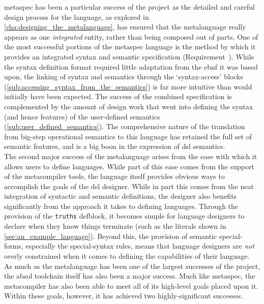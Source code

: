 \gls{metaspec} has been a particular success of the project as the detailed and careful design process for the language, as explored in \autoref{cha:designing_the_metalanguage}, has ensured that the metalanguage really appears as one \textit{integrated} entity, rather than being composed out of parts.
One of the most successful portions of the metaspec language is the method by which it provides an integrated syntax and semantic specification (Requirement~).
While the syntax definition format required little adaptation from the \gls{ebnf} it was based upon, the linking of syntax and semantics through the `syntax-access' blocks (\autoref{sub:accessing_syntax_from_the_semantics}) is far more intuitive than would initially have been expected. 
The success of the combined specification is complemented by the amount of design work that went into defining the syntax (and hence features) of the user-defined semantics (\autoref{sub:user_defined_semantics}).
The comprehensive nature of the translation from big-step operational semantics to this language has retained the full set of semantic features, and is a big boon in the expression of \gls{dsl} semantics.\\

The second major success of the metalanguage arises from the ease with which it allows users to define languages. 
While part of this ease comes from the support of the metacompiler tools, the language itself provides obvious ways to accomplish the goals of the \gls{dsl} designer. 
While in part this comes from the neat integration of syntactic and semantic definitions, the designer also benefits significantly from the approach it takes to defining languages. 
Through the provision of the \texttt{truths} defblock, it becomes simple for language designers to declare when they know things terminate (such as the literals shown in \autoref{sec:an_example_language}).
Beyond this, the provision of semantic special-forms, especially the special-syntax rules, means that language designers are \textit{not} overly constrained when it comes to defining the capabilities of their language.\\

As much as the metalanguage has been one of the largest successes of the project, the \gls{absol} toolchain itself has also been a major success. 
Much like \gls{metaspec}, the metacompiler has also been able to meet all of its high-level goals placed upon it.
Within these goals, however, it has achieved two highly-significant successes.\\

